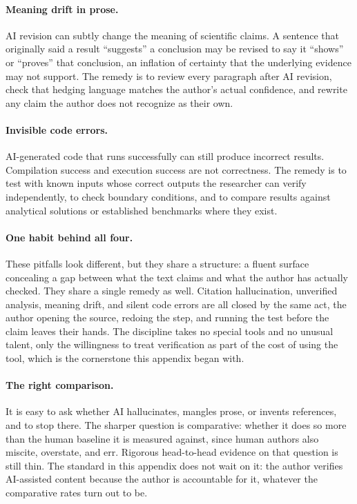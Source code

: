 \documentclass{SIAMbook2023}
\begin{document}
\paragraph{Meaning drift in prose.}
AI revision can subtly change the meaning of scientific claims. A sentence that originally said a result ``suggests'' a conclusion may be revised to say it ``shows'' or ``proves'' that conclusion, an inflation of certainty that the underlying evidence may not support. The remedy is to review every paragraph after AI revision, check that hedging language matches the author's actual confidence, and rewrite any claim the author does not recognize as their own.

\paragraph{Invisible code errors.}
AI-generated code that runs successfully can still produce incorrect results. Compilation success and execution success are not correctness. The remedy is to test with known inputs whose correct outputs the researcher can verify independently, to check boundary conditions, and to compare results against analytical solutions or established benchmarks where they exist.

\paragraph{One habit behind all four.}
These pitfalls look different, but they share a structure: a fluent surface concealing a gap between what the text claims and what the author has actually checked. They share a single remedy as well. Citation hallucination, unverified analysis, meaning drift, and silent code errors are all closed by the same act, the author opening the source, redoing the step, and running the test before the claim leaves their hands. The discipline takes no special tools and no unusual talent, only the willingness to treat verification as part of the cost of using the tool, which is the cornerstone this appendix began with.

\paragraph{The right comparison.}
It is easy to ask whether AI hallucinates, mangles prose, or invents references, and to stop there. The sharper question is comparative: whether it does so more than the human baseline it is measured against, since human authors also miscite, overstate, and err. Rigorous head-to-head evidence on that question is still thin. The standard in this appendix does not wait on it: the author verifies AI-assisted content because the author is accountable for it, whatever the comparative rates turn out to be.
\end{document}
